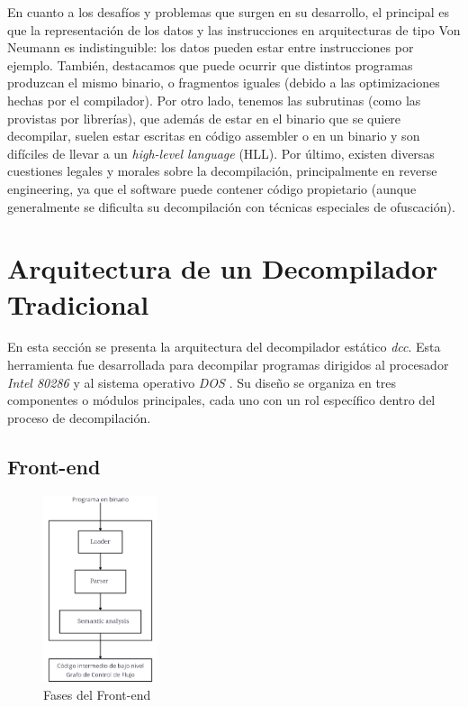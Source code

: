 \documentclass[runningheads]{llncs}
\begin{document}
En cuanto a los desafíos y problemas que surgen en su desarrollo, el principal es que la representación
de los datos y las instrucciones en arquitecturas de tipo Von Neumann es indistinguible: los datos pueden
estar entre instrucciones por ejemplo. También, destacamos que puede ocurrir que distintos programas
produzcan el mismo binario, o fragmentos iguales (debido a las optimizaciones hechas por el compilador).
Por otro lado, tenemos las subrutinas (como las provistas por librerías), que además de estar en el binario
que se quiere decompilar, suelen estar escritas en código assembler o en un binario y son difíciles de 
llevar a un \textit{high-level language} (HLL).  Por último, existen diversas cuestiones legales y morales
sobre la decompilación, principalmente en reverse engineering, ya que el software puede contener
código propietario (aunque generalmente se dificulta su decompilación con técnicas especiales de
ofuscación).

%
\section{Arquitectura de un Decompilador Tradicional}
En esta sección se presenta la arquitectura del decompilador estático \textit{dcc}. Esta herramienta
fue desarrollada para decompilar programas dirigidos al procesador \textit{Intel 80286} y al sistema
operativo \textit{DOS} \cite{cifuentes-dcc}. Su diseño se organiza en tres componentes o módulos principales, cada uno
con un rol específico dentro del proceso de decompilación.

\subsection{Front-end}
\begin{figure}
  \vspace{-15pt}
  \centering
  \includegraphics[width=0.3\textwidth]{frontend-phases.png}
  \caption{Fases del Front-end}
  \label{fig: frontend-phases}
  \vspace{-15pt}
\end{figure}
\end{document}
